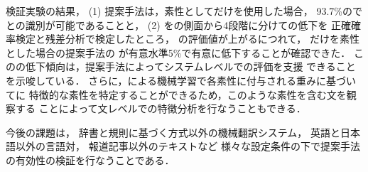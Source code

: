 \documentclass[japanese]{jnlp_1.4}
\newcommand{\AL}{}
\newcommand{\FLU}{}
\newcommand{\HUM}{}
\newcommand{\MT}{}
\newcommand{\SVM}{}
\newcommand{\ACC}{}
\begin{document}
検証実験の結果，
(1) 提案手法は，素性として{\AL}だけを使用した場合，
93.7\%の{\ACC}で{\HUM}と{\MT}の識別が可能であることと，
(2) {\MT}を{\FLU}の側面から4段階に分けて{\ACC}の低下を
正確確率検定と残差分析で検定したところ，
{\FLU}の評価値が上がるにつれて，
{\AL}だけを素性とした場合の提案手法の
{\ACC}が有意水準5\%で有意に低下することが確認できた．
この{\ACC}の低下傾向は，提案手法によってシステムレベルでの評価を支援
できることを示唆している．
さらに，{\SVM}による機械学習で各素性に付与される重みに基づいて{\MT}に
特徴的な素性を特定することができるため，このような素性を含む文を観察する
ことによって文レベルでの特徴分析を行なうこともできる．

今後の課題は，
辞書と規則に基づく方式以外の機械翻訳システム，
英語と日本語以外の言語対，
報道記事以外のテキストなど
様々な設定条件の下で提案手法の有効性の検証を行なうことである．
\end{document}
